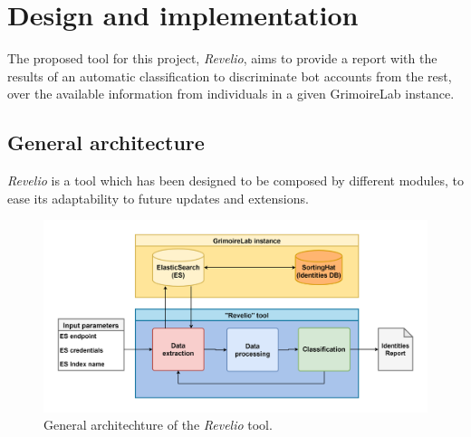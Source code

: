 \documentclass[a4paper, 12pt]{book}
\begin{document}




\cleardoublepage


\chapter{Design and implementation}
\label{chap:design-implementation}

The proposed tool for this project, \emph{Revelio}, aims to provide a report with the results of an automatic classification to discriminate bot accounts from the rest, over the available information from individuals in a given GrimoireLab instance.


\section{General architecture} 
\label{sec:architecture}

\emph{Revelio} is a tool which has been designed to be composed by different modules, to ease its adaptability to future updates and extensions.

\begin{figure}
  \centering
  \includegraphics[width=17cm, keepaspectratio]{img/general-architecture-revelio.png}
  \caption{General architechture of the \emph{Revelio} tool.}
  \label{fig:general-arch-revelio}
\end{figure}
\end{document}
